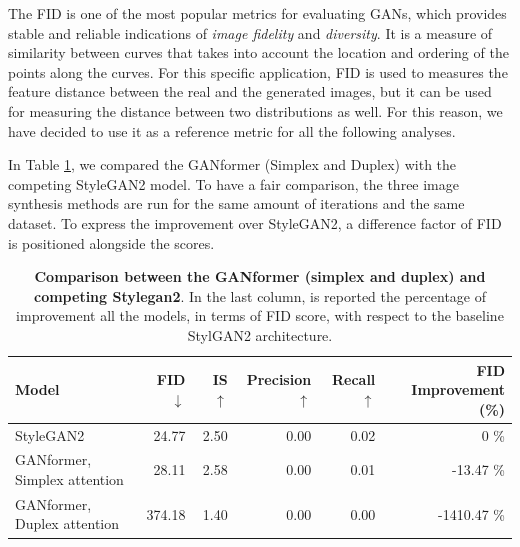 \documentclass{article}
\begin{document}
	The FID is one of the most popular metrics for evaluating GANs, which provides stable and reliable 
	indications of \textit{image fidelity} and \textit{diversity}. 
	It is a measure of similarity between curves that takes into account the location and ordering of the 
	points along the curves. 
	For this specific application, FID is used to measures the feature distance between the real and the 
	generated images, but it can be used for measuring the distance between two distributions as well.
	For this reason, we have decided to use it as a reference metric for all the following analyses.
	
	In Table \ref{tab:our-results}, we compared the GANformer (Simplex and Duplex) with the competing 
	StyleGAN2 model. To have a fair comparison, the three image synthesis methods are run for the 
	same amount of iterations and the same dataset.
	To express the improvement over StyleGAN2, a difference factor of FID is positioned alongside the 
	scores.
	\begin{table}[htb]
    	\centering
		\caption{\textbf{Comparison between the GANformer (simplex and duplex) and competing 
		Stylegan2}.  In the last column, is reported the percentage of improvement all the models, in terms 
			of FID score, with respect to the baseline StylGAN2 architecture.}
		\label{tab:our-results}
		\vspace{3mm}
		\small
		\begin{tabular}{l|rrrrr}
			\toprule
			Model                        & FID $\downarrow$  & IS $\uparrow$& Precision$\uparrow$  & Recall 
			$\uparrow$& FID Improvement (\%)\\ 
			\midrule
			StyleGAN2                    &  24.77 & 2.50 & 0.00 & 0.02 & 0 \%\\ 
			GANformer, Simplex attention & 28.11 & 2.58 & 0.00 & 0.01 & -13.47 \%\\ 
			GANformer, Duplex attention  & 374.18 & 1.40 & 0.00 & 0.00 & -1410.47 \% \\ 
			\bottomrule
		\end{tabular}
	\end{table}
	
\end{document}

